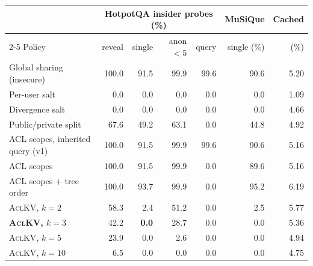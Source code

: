 \begin{tabular}{@{}l r r r r r r@{}}
\toprule
 & \multicolumn{4}{c}{HotpotQA insider probes (\%)} & MuSiQue & Cached \\ \cmidrule(lr){2-5}
Policy & reveal & single & anon$<$5 & query & single (\%) & (\%) \\
\midrule
Global sharing (insecure) & 100.0 & 91.5 & 99.9 & 99.6 & 90.6 & 5.20 \\
Per-user salt & 0.0 & 0.0 & 0.0 & 0.0 & 0.0 & 1.09 \\
Divergence salt & 0.0 & 0.0 & 0.0 & 0.0 & 0.0 & 4.66 \\
Public/private split & 67.6 & 49.2 & 63.1 & 0.0 & 44.8 & 4.92 \\
ACL scopes, inherited query (v1) & 100.0 & 91.5 & 99.9 & 99.6 & 90.6 & 5.16 \\
ACL scopes & 100.0 & 91.5 & 99.9 & 0.0 & 89.6 & 5.16 \\
ACL scopes + tree order & 100.0 & 93.7 & 99.9 & 0.0 & 95.2 & 6.19 \\
\textsc{AclKV}, $k{=}2$ & 58.3 & 2.4 & 51.2 & 0.0 & 2.5 & 5.77 \\
\textbf{\textsc{AclKV}, $k{=}3$} & 42.2 & \textbf{0.0} & 28.7 & 0.0 & 0.0 & 5.36 \\
\textsc{AclKV}, $k{=}5$ & 23.9 & 0.0 & 2.6 & 0.0 & 0.0 & 4.94 \\
\textsc{AclKV}, $k{=}10$ & 6.5 & 0.0 & 0.0 & 0.0 & 0.0 & 4.75 \\
\bottomrule
\end{tabular}
